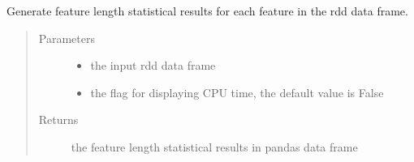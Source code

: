 \documentclass[letterpaper,12pt,english]{sphinxmanual}
\begin{document}
\begin{fulllineitems}
Generate feature length statistical results for each feature in the rdd data frame.
\begin{quote}\begin{description}
\item[{Parameters}] \leavevmode\begin{itemize}
\item {} 
 \textendash{} the input rdd data frame

\item {} 
 \textendash{} the flag for displaying CPU time, the default value is False

\end{itemize}

\item[{Returns}] \leavevmode
the feature length statistical results in pandas data frame

\end{description}\end{quote}


\end{fulllineitems}
\end{document}
